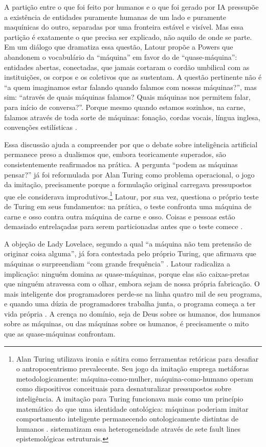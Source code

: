 A partição entre o que foi feito por humanos e o que foi gerado por IA pressupõe a existência de entidades puramente humanas de um lado e puramente maquínicas do outro, separadas por uma fronteira estável e visível. Mas essa partição é exatamente o que precisa ser explicado, não aquilo de onde se parte. Em um diálogo que dramatiza essa questão, Latour propõe a Powers que abandonem o vocabulário da ``máquina'' em favor do de ``quase-máquina'': entidades abertas, conectadas, que jamais cortaram o cordão umbilical com as instituições, os corpos e os coletivos que as sustentam. A questão pertinente não é ``a quem imaginamos estar falando quando falamos com nossas máquinas?'', mas sim: ``através de quais máquinas falamos? Quais máquinas nos permitem falar, para início de conversa?''. Porque mesmo quando estamos sozinhos, na carne, falamos através de toda sorte de máquinas: fonação, cordas vocais, língua inglesa, convenções estilísticas \parencite{Latour2008Powers}.

Essa discussão ajuda a compreender por que o debate sobre inteligência artificial permanece preso a dualismos que, embora teoricamente superados, são consistentemente reafirmados na prática. A pergunta ``podem as máquinas pensar?'' já foi reformulada por Alan Turing como problema operacional, o jogo da imitação, precisamente porque a formulação original carregava pressupostos que ele considerava improdutivos.\footnote{Alan Turing utilizava ironia e sátira como ferramentas retóricas para desafiar o antropocentrismo prevalecente. Seu jogo da imitação emprega metáforas metodologicamente: máquina-como-mulher, máquina-como-humano operam como dispositivos conceituais para desnaturalizar pressupostos sobre inteligência. A imitação para Turing funcionava mais como um princípio matemático do que uma identidade ontológica: máquinas poderiam imitar comportamento inteligente permanecendo ontologicamente distintas de humanos \parencite[p. 5]{Goncalves2024BeautifulThought}. \textcite{Quattrociocchi2025Epistemological} sistematizam essa heterogeneidade através de sete fault lines epistemológicas estruturais.} Latour, por sua vez, questiona o próprio teste de Turing em seus fundamentos: na prática, o teste confronta uma máquina de carne e osso contra outra máquina de carne e osso. Coisas e pessoas estão demasiado entrelaçadas para serem particionadas antes que o teste comece \parencite{Latour2008Powers}.

A objeção de Lady Lovelace, segundo a qual ``a máquina não tem pretensão de originar coisa alguma'', já fora contestada pelo próprio Turing, que afirmava que máquinas o surpreendiam ``com grande frequência'' \parencite{Turing1950CMI}. Latour radicaliza a implicação: ninguém domina as quase-máquinas, porque elas são caixas-pretas que ninguém atravessa com o olhar, embora sejam de nossa própria fabricação. O mais inteligente dos programadores perde-se na linha quatro mil de seu programa, e quando uma dúzia de programadores trabalha junta, o programa começa a ter vida própria \parencite{Latour2008Powers}. A crença no domínio, seja de Deus sobre os humanos, dos humanos sobre as máquinas, ou das máquinas sobre os humanos, é precisamente o mito que as quase-máquinas confrontam.

